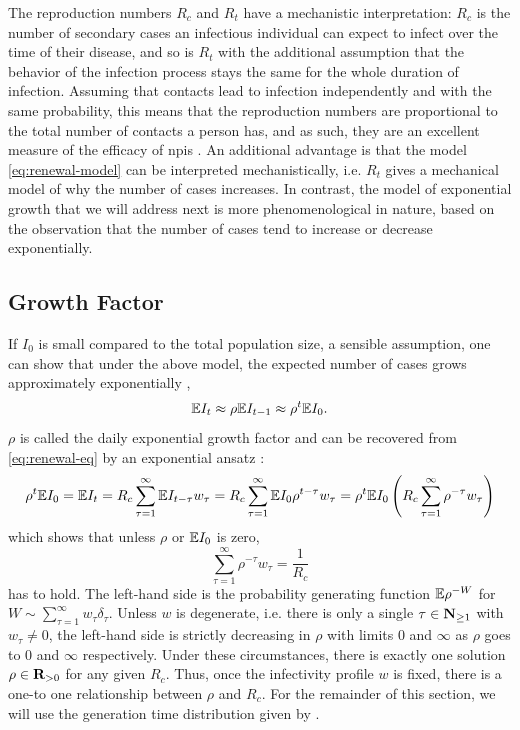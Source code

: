 The reproduction numbers $R_{c}$ and $R_{t}$ have a mechanistic interpretation: $R_{c}$ is the number of secondary cases an infectious individual can expect to infect over the time of their disease, and so is $R_{t}$ with the additional assumption that the behavior of the infection process stays the same for the whole duration of infection. 
Assuming that contacts lead to infection independently and with the same probability, this means that the reproduction numbers are proportional to the total number of contacts a person has, and as such, they are an excellent measure of the efficacy of \glspl{npi} \citep{Brauner2021Inferring,Khazaei2023Using,Flaxman2020Estimating}. 
An additional advantage is that the model \eqref{eq:renewal-model} can be interpreted mechanistically, i.e. $R_{t}$ gives a mechanical model of why the number of cases increases. In contrast, the  model of exponential growth that we will address next is more phenomenological in nature, based on the observation that the number of cases tend to increase or decrease exponentially. 

\subsection{Growth Factor}
\label{subsec:growth_factor}
If $I_{0}$ is small compared to the total population size, a sensible assumption, one can show that under the above model, the expected number of cases grows approximately exponentially \citep[Section 1.2]{Diekmann2013Mathematical}, 
\begin{align}
    \label{eq:exponential-growth}
\mathbb E I_{t} \approx \rho \mathbb E I_{t - 1} \approx \rho^{t} \mathbb E I_{0}.
\end{align}
$\rho$ is called the daily exponential growth factor and can be recovered from \eqref{eq:renewal-eq} by an exponential ansatz \citep{Wallinga2007How}:
$$
    \rho^{t} \mathbb E I_{0} = \mathbb E I_{t} = R_c \sum_{\tau = 1}^\infty \mathbb E I_{t - \tau}w_{\tau} = R_{c} \sum_{\tau = 1}^\infty \mathbb E I_{0} \rho^{t - \tau} w_{\tau} = \rho^{t} \mathbb E I_{0} \left( R_{c} \sum_{\tau = 1} ^{\infty} \rho^{-\tau}w_{\tau}\right)
$$
which shows that unless $\rho$ or $\mathbb E I_{0}$ is zero, 
$$
    \sum_{\tau = 1}^\infty \rho^{-\tau} w_{\tau} = \frac{1}{R_{c}}
$$
has to hold. The left-hand side is the probability generating function $\mathbb E \rho^{-W}$ for $W \sim \sum_{\tau = 1}^\infty w_{\tau}\delta_{\tau}$. 
Unless $w$ is degenerate, i.e. there is only a single $\tau \in \mathbf N_{\geq 1}$ with $w_{\tau} \neq 0$, the left-hand side is strictly decreasing in $\rho$ with limits $0$ and $\infty$ as $\rho$ goes to $0$ and $\infty$ respectively. Under these circumstances, there is exactly one solution $\rho \in \mathbf R_{>0}$ for any given $R_{c}$. 
Thus, once the infectivity profile $w$ is fixed, there is a one-to one relationship between $\rho$ and $R_{c}$. For the remainder of this section, we will use the generation time distribution given by .

